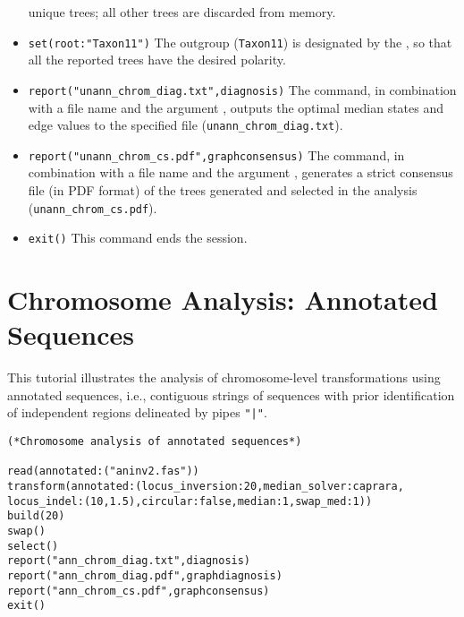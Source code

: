 \begin{itemize}
unique trees; all other trees are discarded from memory. 
\item \texttt{set(root:"Taxon11")} The outgroup (\texttt{Taxon11}) is designated by the , so that all the 
reported trees have the desired polarity.
\item \texttt{report("unann\_chrom\_diag.txt",diagnosis)}  The  command, in combination with a 
file name and the argument , outputs the optimal median states and edge values to the 
specified file (\texttt{unann\_chrom\_diag.txt}). 
\item \texttt{report("unann\_chrom\_cs.pdf",graphconsensus)}  The  command, in combination with a file 
name and the argument , generates a strict consensus file (in PDF format) of the trees 
generated and selected in the analysis (\texttt{unann\_chrom\_cs.pdf}). 
\item \texttt{exit()} This command ends the \poy session.
\end{itemize}


\section{Chromosome Analysis: Annotated Sequences}{\label{tutorial9}}

This tutorial illustrates the analysis of chromosome-level transformations using 
annotated sequences, i.e., contiguous strings of sequences with prior 
identification of independent regions delineated by pipes \texttt{"|"}. 

\begin{verbatim}
(*Chromosome analysis of annotated sequences*)

read(annotated:("aninv2.fas"))
transform(annotated:(locus_inversion:20,median_solver:caprara,
locus_indel:(10,1.5),circular:false,median:1,swap_med:1))
build(20)
swap()
select()
report("ann_chrom_diag.txt",diagnosis)
report("ann_chrom_diag.pdf",graphdiagnosis)
report("ann_chrom_cs.pdf",graphconsensus)
exit()
\end{verbatim}


